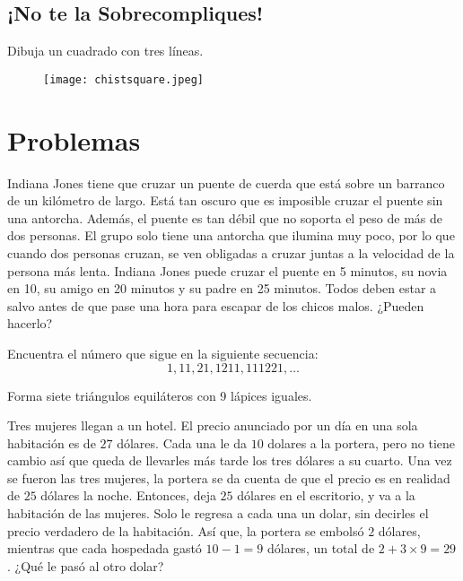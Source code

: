 \subsection{¡No te la Sobrecompliques!}

\begin{example}
    Dibuja un cuadrado con tres líneas.
\end{example}

\begin{figure}[h]
    \centering
    \texttt{[image: chistsquare.jpeg]}
\end{figure}

\section{Problemas}

\begin{problem}
    Indiana Jones tiene que cruzar un puente de cuerda que está 
    sobre un barranco de un kilómetro de largo. Está tan oscuro que es 
    imposible cruzar el puente sin una antorcha. Además, el puente es tan 
    débil que no soporta el peso de más de dos personas. 
    El grupo solo tiene una antorcha que ilumina muy poco, por lo que 
    cuando dos personas cruzan, se ven obligadas a cruzar juntas a la 
    velocidad de la persona más lenta. Indiana Jones puede cruzar el 
    puente en 5 minutos, su novia en 10, su amigo en 20 minutos y 
    su padre en 25 minutos. Todos deben estar a salvo antes de que pase 
    una hora para escapar de los chicos malos. ¿Pueden hacerlo?
\end{problem}

\begin{problem}
    Encuentra el número que sigue en la siguiente secuencia:
    \[1, 11, 21, 1211, 111221, \dots\]
\end{problem}

\begin{problem}
    Forma siete triángulos equiláteros con 9 lápices iguales.  
\end{problem}

\begin{problem}
    Tres mujeres llegan a un hotel. El precio anunciado por un día 
    en una sola habitación es de $27$ dólares. Cada una le da $10$ dolares 
    a la portera, pero no tiene cambio así que queda de llevarles más tarde 
    los tres dólares a su cuarto. Una vez se fueron las tres mujeres, 
    la portera se da cuenta de que el precio es en realidad de $25$ dólares 
    la noche. Entonces, deja $25$ dólares en el escritorio, y va a la habitación 
    de las mujeres. Solo le regresa a cada una un dolar, sin decirles el 
    precio verdadero de la habitación. Así que, la portera se embolsó $2$ 
    dólares, mientras que cada hospedada gastó $10-1=9$ dólares, un total de 
    $2 +3  \times 9 = 29$. ¿Qué le pasó al otro dolar?
\end{problem}

